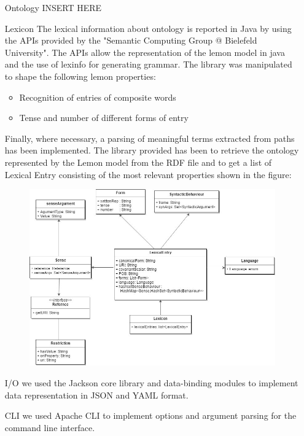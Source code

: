 \begin{itemize}
	\item[Ontology] INSERT HERE
	
	\item[Lexicon] The lexical information about ontology is reported in Java by using the APIs provided by the "Semantic Computing Group @ Bielefeld University". The APIs allow the representation of the lemon model in java and the use of lexinfo for generating grammar. The library was manipulated to shape the following lemon properties: 
	\begin{itemize}
		\item Recognition of entries of composite words
		\item Tense and number of different forms of entry 
	\end{itemize}	
Finally, where necessary, a parsing of meaningful terms extracted from paths has been implemented.
The library provided has been to retrieve the ontology represented by the Lemon model from the RDF file and to get a list of Lexical Entry consisting of the most relevant properties shown in the figure:
\begin{figure}[tp]
   \centering
    \includegraphics[scale=100]{./fig/lemon}
    \label{fig: lemon}
\end{figure}

	\item[I/O] we used the Jackson core library and data-binding modules to implement data representation in JSON and YAML format.
	
	\item[CLI] we used Apache CLI to implement options and argument parsing for the command line interface.
	

\end{itemize}
